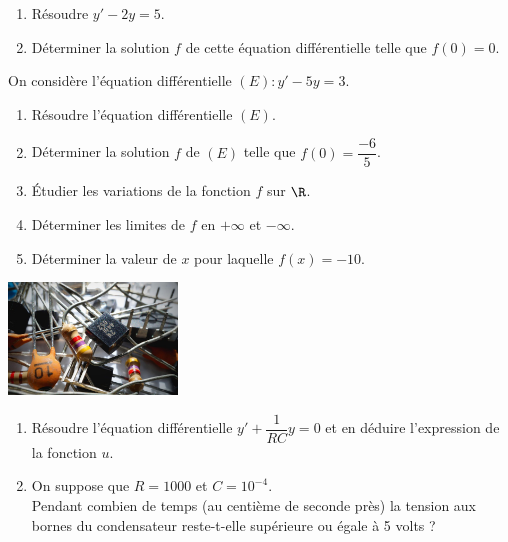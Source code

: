 \documentclass[a4paper,11pt,exos]{nsi} %
\begin{document}
\exo{}
\begin{enumerate}
    \item Résoudre $y'-2y=5$.
    \item Déterminer la solution $f$ de cette équation différentielle telle que $f(0)=0$.
\end{enumerate}

\exo{}
On considère l'équation différentielle $(E) : y'-5y=3$.
\begin{enumerate}
    \item Résoudre l'équation différentielle $(E)$.
    \item Déterminer la solution $f$ de $(E)$ telle que $f(0)=\dfrac{-6}{5}$.
    \item Étudier les variations de la fonction $f$ sur $\R$.
    \item Déterminer les limites de $f$ en $+\infty$ et $-\infty$.
    \item Déterminer la valeur de $x$ pour laquelle $f(x)=-10$.
\end{enumerate}

{\includegraphics[width=4.5cm]{capacitor-1835729_640.jpg}}
\begin{enumerate}
    \item Résoudre l'équation différentielle $y'+\dfrac{1}{RC}y=0$ et en déduire l'expression de la fonction $u$.
    \item On suppose que $R=1000$ et $C=10^{-4}$.\\
    Pendant combien de temps (au centième de seconde près) la tension aux bornes du condensateur reste-t-elle supérieure ou égale à 5 volts ?
\end{enumerate}
\end{document}
